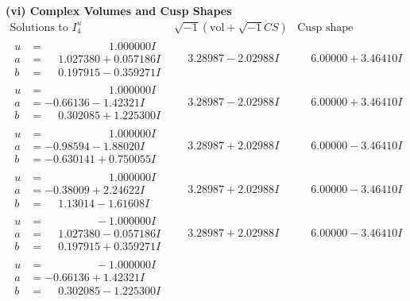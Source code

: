 \documentclass[1p]{elsarticle_modified}
\theoremstyle{definition}
\newcommand{\I}{\sqrt{-1}}
\begin{document}
\newpage\flushleft \textbf{(vi) Complex Volumes and Cusp Shapes}
$$\begin{array}{c|c|c}  
\text{Solutions to }I^u_{4}& \I (\text{vol} + \sqrt{-1}CS) & \text{Cusp shape}\\
 \hline 
\begin{aligned}
u &= \phantom{-0.000000 -}1.000000 I \\
a &= \phantom{-}1.027380 + 0.057186 I \\
b &= \phantom{-}0.197915 - 0.359271 I\end{aligned}
 & \phantom{-}3.28987 - 2.02988 I & \phantom{-}6.00000 + 3.46410 I \\ \hline\begin{aligned}
u &= \phantom{-0.000000 -}1.000000 I \\
a &= -0.66136 - 1.42321 I \\
b &= \phantom{-}0.302085 + 1.225300 I\end{aligned}
 & \phantom{-}3.28987 - 2.02988 I & \phantom{-}6.00000 + 3.46410 I \\ \hline\begin{aligned}
u &= \phantom{-0.000000 -}1.000000 I \\
a &= -0.98594 - 1.88020 I \\
b &= -0.630141 + 0.750055 I\end{aligned}
 & \phantom{-}3.28987 + 2.02988 I & \phantom{-}6.00000 - 3.46410 I \\ \hline\begin{aligned}
u &= \phantom{-0.000000 -}1.000000 I \\
a &= -0.38009 + 2.24622 I \\
b &= \phantom{-}1.13014 - 1.61608 I\end{aligned}
 & \phantom{-}3.28987 + 2.02988 I & \phantom{-}6.00000 - 3.46410 I \\ \hline\begin{aligned}
u &= \phantom{-0.000000 } -1.000000 I \\
a &= \phantom{-}1.027380 - 0.057186 I \\
b &= \phantom{-}0.197915 + 0.359271 I\end{aligned}
 & \phantom{-}3.28987 + 2.02988 I & \phantom{-}6.00000 - 3.46410 I \\ \hline\begin{aligned}
u &= \phantom{-0.000000 } -1.000000 I \\
a &= -0.66136 + 1.42321 I \\
b &= \phantom{-}0.302085 - 1.225300 I\end{aligned}

\end{array}$$
\end{document}
